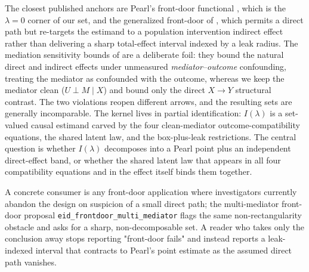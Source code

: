 \documentclass[11pt]{article}
\theoremstyle{definition}
\theoremstyle{plain}
\theoremstyle{remark}
\begin{document}
The closest published anchors are Pearl's front-door functional \citep[\S3.3.2, eq.~(3.42)]{Pearl1995CausalDiagrams},
which is the $\lambda=0$ corner of our set, and the generalized front-door of
\citet{FulcherShpitserMarealleTchetgen2017GeneralizedFrontDoor}, which permits a direct path but
re-targets the estimand to a population intervention indirect effect rather than delivering a sharp
total-effect interval indexed by a leak radius. The mediation sensitivity bounds of
\citet[\S2--3]{DingVanderWeele2016SharpMediationSensitivity} are a deliberate foil: they bound the
natural direct and indirect effects under unmeasured \emph{mediator--outcome} confounding, treating the
mediator as confounded with the outcome, whereas we keep the mediator clean ($U\perp M\mid X$) and bound
only the direct $X\to Y$ structural contrast. The two violations reopen different arrows, and the
resulting sets are generally incomparable. The
kernel lives in partial identification: $I(\lambda)$ is a set-valued causal estimand carved by the four
clean-mediator outcome-compatibility equations, the shared latent law, and the box-plus-leak
restrictions. The central question is whether $I(\lambda)$ decomposes into a Pearl point plus an
independent direct-effect band, or whether the shared latent law that appears in all four compatibility
equations and in the effect itself binds them together.

A concrete consumer is any front-door application where investigators currently abandon the design on
suspicion of a small direct path; the multi-mediator front-door proposal \texttt{eid\_frontdoor\_multi\_mediator}
flags the same non-rectangularity obstacle and asks for a sharp, non-decomposable set. A reader who takes
only the conclusion away stops reporting "front-door fails" and instead reports a leak-indexed interval
that contracts to Pearl's point estimate as the assumed direct path vanishes.
\end{document}
